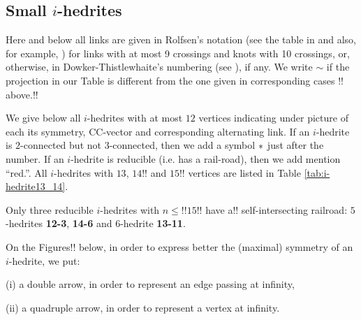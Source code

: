 \documentclass[12pt]{article}
\begin{document}
\begin{remark!!}
\section{Small $i$-hedrites}

Here and below all links are given 
in Rolfsen's notation (see the table in \cite{Rolf} and also,  
for example, \cite{Kaw}) for links with at most 9 
crossings and knots with 10 crossings, or, otherwise, in
Dowker-Thistlewhaite's numbering (see \cite{T}), if any.
We write $\sim$ if the projection in our Table is different 
from the one given in corresponding cases !! above.!! 

We give below all $i$-hedrites with at most $12$ vertices indicating under 
picture of each its symmetry, CC-vector and corresponding alternating link.
If an $i$-hedrite is $2$-connected but not $3$-connected, then we add
a symbol ${\bf *}$ just after the number. If an $i$-hedrite is reducible
(i.e. has a rail-road), then we add mention ``red.''. All $i$-hedrites
with $13$, $14!!$ and $15!!$ vertices are listed in Table \ref{tab:i-hedrite13_14}. 

Only three reducible $i$-hedrites with $n \le!! 15!!$ have a!! self-intersecting
railroad: $5$-hedrites {\bf 12-3}, {\bf 14-6} and $6$-hedrite {\bf 13-11}.


On the Figures!! below, in order to express better the (maximal)
symmetry of an $i$-hedrite, we put:

(i) a double arrow, in order to represent an edge passing at infinity,

(ii) a quadruple arrow, in order to represent a vertex at infinity.






\end{remark!!}
\end{document}
